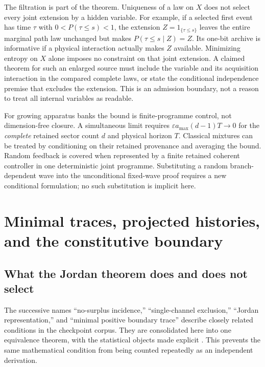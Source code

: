 \documentclass[11pt,oneside,openany]{book}
\theoremstyle{definition}
\theoremstyle{remark}\newtheorem{remark}[theorem]{Remark}
\begin{document}
The filtration is part of the theorem. Uniqueness of a law on $X$ does not
select every joint extension by a hidden variable. For example, if a
selected first event has time $\tau$ with $0<P(\tau\leq s)<1$, the extension
$Z=1_{\{\tau\leq s\}}$ leaves the entire marginal path law unchanged but
makes $P(\tau\leq s\mid Z)=Z$. Its one-bit archive is informative if a
physical interaction actually makes $Z$ available. Minimizing entropy on
$X$ alone imposes no constraint on that joint extension. A claimed theorem
for such an enlarged source must include the variable and its acquisition
interaction in the compared complete laws, or state the conditional
independence premise that excludes the extension. This is an admission
boundary, not a reason to treat all internal variables as readable.

For growing apparatus banks the bound is finite-programme control, not
dimension-free closure. A simultaneous limit requires
$\varepsilon a_{\max}(d-1)T\to0$ for the \emph{complete} retained sector
count $d$ and physical horizon $T$. Classical mixtures can be treated by
conditioning on their retained provenance and averaging the bound. Random
feedback is covered when represented by a finite retained coherent
controller in one deterministic joint programme. Substituting a random
branch-dependent wave into the unconditional fixed-wave proof requires a
new conditional formulation; no such substitution is implicit here.

\chapter{Minimal traces, projected histories, and the constitutive boundary}
\label{stat:boundary-chapter}

\section{What the Jordan theorem does and does not select}

The successive names ``no-surplus incidence,'' ``single-channel exclusion,''
``Jordan representation,'' and ``minimal positive boundary trace'' describe
closely related conditions in the checkpoint corpus. They are consolidated
here into one equivalence theorem, with the statistical objects made
explicit \cite{C03,M30}. This prevents the same mathematical condition from
being counted repeatedly as an independent derivation.
\end{document}
